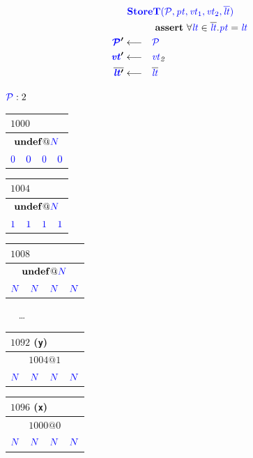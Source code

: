 \documentclass[acmsmall,review,anonymous]{acmart}\settopmatter{printfolios=true,printccs=false,printacmref=false}
\begin{document}
\[\begin{aligned}
\truledef{\storet}
\assert{\forall \lt \in \overline{\lt} . \pt = \lt}
\settag{\PCT'}{\PCT}
\settag{\vt'}{\vt_2}
\settag{\overline{\lt'}}{\overline{\lt}}
\end{aligned}\]

\vspace{\abovedisplayskip}

\(\mathcal{\color{blue} P}: 2\)

\vspace{\abovedisplayskip}

\begin{tabular}{|c|c|c|c|}
  \multicolumn{4}{l}{\(1000\)} \\
  \hline
  \multicolumn{4}{|c|}{\(\mathbf{undef} @ {\color{blue} N}\)} \\
  \hline
  \({\color{blue} 0}\) & \({\color{blue} 0}\) & \({\color{blue} 0}\) & \({\color{blue} 0}\) \\
  \hline
\end{tabular}\hspace{-2pt}
\begin{tabular}{|c|c|c|c|}
  \multicolumn{4}{l}{\(1004\)} \\
  \hline
  \multicolumn{4}{|c|}{\(\mathbf{undef} @ {\color{blue} N}\)} \\
  \hline
  \({\color{blue} 1}\) & \({\color{blue} 1}\) & \({\color{blue} 1}\) & \({\color{blue} 1}\) \\
  \hline
\end{tabular}\hspace{-2pt}
\begin{tabular}{|c|c|c|c|}
  \multicolumn{4}{l}{\(1008\)} \\
  \hline
  \multicolumn{4}{|c|}{\(\mathbf{undef} @ {\color{blue} N}\)} \\
  \hline
  \footnotesize \({\color{blue} N}\) & \footnotesize \({\color{blue} N}\) & \footnotesize \({\color{blue} N}\) & \footnotesize \({\color{blue} N}\) \\
  \hline
\end{tabular}~ ~\dots~ ~
\begin{tabular}{|c|c|c|c|}
  \multicolumn{4}{l}{\(1092\) ({\tt y})} \\
  \hline
  \multicolumn{4}{|c|}{\(1004 @ 1\)} \\
  \hline
  \footnotesize \({\color{blue} N}\) & \footnotesize \({\color{blue} N}\) & \footnotesize \({\color{blue} N}\) & \footnotesize \({\color{blue} N}\) \\
  \hline
\end{tabular}\hspace{-2pt}
\begin{tabular}{|c|c|c|c|}
  \multicolumn{4}{l}{\(1096\) ({\tt x})} \\
  \hline
  \multicolumn{4}{|c|}{\(1000 @ 0\)} \\
  \hline
  \footnotesize \({\color{blue} N}\) & \footnotesize \({\color{blue} N}\) & \footnotesize \({\color{blue} N}\) & \footnotesize \({\color{blue} N}\) \\
  \hline
\end{tabular}
\end{document}
